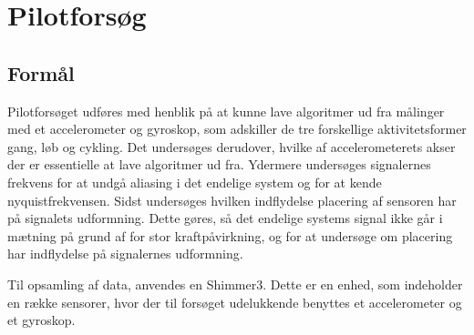 \chapter{Pilotforsøg}\vspace{-.75cm}\label{pilot}
\section{Formål}
Pilotforsøget udføres med henblik på at kunne lave algoritmer ud fra målinger med et accelerometer og gyroskop, som adskiller de tre forskellige aktivitetsformer gang, løb og cykling. Det undersøges derudover, hvilke af accelerometerets akser der er essentielle at lave algoritmer ud fra. Ydermere undersøges signalernes frekvens for at undgå aliasing i det endelige system og for at kende nyquistfrekvensen. Sidst undersøges hvilken indflydelse placering af sensoren har på signalets udformning. Dette gøres, så det endelige systems signal ikke går i mætning på grund af for stor kraftpåvirkning, og for at undersøge om placering har indflydelse på signalernes udformning.

Til opsamling af data, anvendes en Shimmer3. Dette er en enhed, som indeholder en række sensorer, hvor der til forsøget udelukkende benyttes et accelerometer og et gyroskop. 

